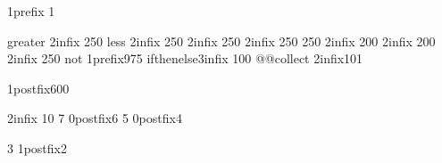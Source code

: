 \pgfmathdeclareoperator{<} {}       {1}{prefix} {1}

\pgfmathdeclareoperator{>} {greater}   {2}{infix} {250}
\pgfmathdeclareoperator{<} {less}      {2}{infix} {250}
     {2}{infix} {250}
   {2}{infix} {250}
 {250}
       {2}{infix} {200}
        {2}{infix} {200}
  {2}{infix} {250}
\pgfmathdeclareoperator{!} {not}       {1}{prefix}{975}
 {ifthenelse}{3}{infix} {100}
\pgfmathdeclareoperator{:} {@@collect}  {2}{infix}{101}

      {1}{postfix}{600}

   {2}{infix}  {10}
\pgfmathdeclareoperator{[}{@startindex}{2}{prefix} {7}
\pgfmathdeclareoperator{]}{@endindex}  {0}{postfix}{6}
 {5}
  {0}{postfix}{4}

 {3}
  {1}{postfix}{2}%



%
\def\pgfmath@startgroup@#1{\edef\pgfmathresult{#1}}
\def\pgfmath@endgroup@{}%

%
\def\pgfmath@startindex@#1#2{%
	\expandafter\pgfmatharray@#1{#2}%
	\expandafter\pgfmath@bgroup@strip\expandafter{\pgfmathresult}%
	\ifx\pgfmath@token@let\bgroup%
		\expandafter\def\expandafter\pgfmathresult\expandafter{\expandafter{\pgfmathresult}}%
	\fi}
\def\pgfmath@endindex@{}%

%
\def\pgfmath@startarray@#1{\expandafter\def\expandafter\pgfmathresult\expandafter{\expandafter{#1}}}
\def\pgfmath@endarray@#1{\expandafter\def\expandafter\pgfmathresult\expandafter{#1}}%


